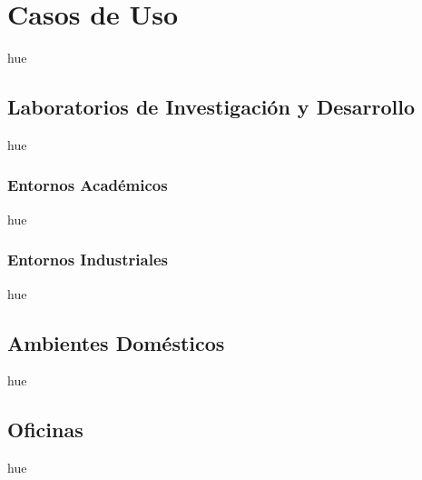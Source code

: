 

\chapter{Casos de Uso}
hue
\section{Laboratorios de Investigación y Desarrollo}
hue
\subsection{Entornos Académicos}
hue
\subsection{Entornos Industriales}
hue

\section{Ambientes Domésticos}
hue

\section{Oficinas}
hue
